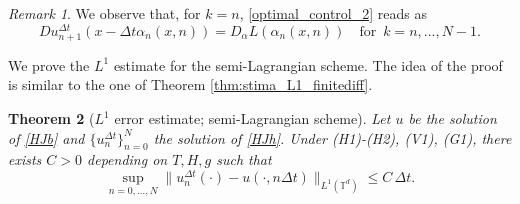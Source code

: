 \documentclass[11pt]{amsart}
\newtheorem{thm}{Theorem}[section]
\theoremstyle{remark}
\newtheorem{rem}[thm]{Remark}
\theoremstyle{definition}
\theoremstyle{Claim}
\theoremstyle{plain}
\newcommand{\dt}{{\Delta t}}
\begin{document}
%
\begin{rem}
	We observe that, for $k=n$, \eqref{optimal_control_2} reads as
	\begin{equation}\label{optimal_control_3}
		Du^\dt_{n+1}(x-\dt\alpha_{n}(x,n)) =D_\alpha L(\alpha_{n}(x,n))   \quad \mbox{for } \, k=n,..., N-1.
	\end{equation}
\end{rem}

We  prove the $L^1$ estimate for the semi-Lagrangian scheme. The idea of the proof is similar to the one of Theorem \ref{thm:stima_L1_finitediff}.	 
\begin{thm}[$L^1$ error estimate; semi-Lagrangian scheme]\label{thm:stima_L1_semilag}
	Let $u$ be the solution of \eqref{HJb} and $\{u^\dt_n\}_{n=0}^N$ the  solution of \eqref{HJh}. Under \textup{(H1)-(H2), (V1), (G1)},  there exists \(C>0\) depending on \(T,H,g\) such that
	\begin{equation}\label{stima_L1_semilag}
		\sup_{n=0,\dots,N}\big\|u_n^\dt(\cdot)-u(\cdot,n\Delta t)\big\|_{L^1(\mathbb{T}^d)} \le C\,\dt.
	\end{equation}
\end{thm}
\end{document}
